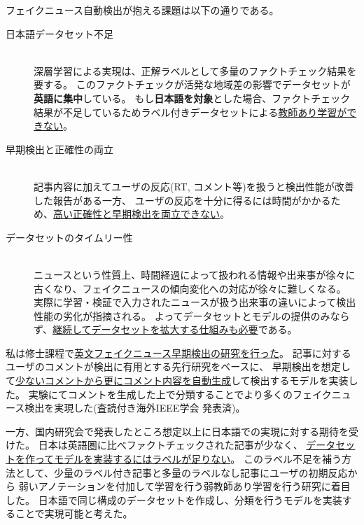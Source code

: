 フェイクニュース自動検出が抱える課題は以下の通りである。
\begin{description}
    \item[日本語データセット不足] \mbox{}\\
        深層学習による実現は、正解ラベルとして多量のファクトチェック結果を要する。
        このファクトチェックが活発な地域差の影響でデータセットが\textbf{英語に集中}\cite{fakenewsnet}している。
        もし\textbf{日本語を対象}とした場合、ファクトチェック結果が不足しているためラベル付きデータセットによる\underline{教師あり学習ができない}。
    \item[早期検出と正確性の両立] \mbox{}\\
        記事内容に加えてユーザの反応(RT, コメント等)を扱うと検出性能が改善した報告がある\cite{Wu:2018:TFF:3159652.3159677}一方、
        ユーザの反応を十分に得るには時間がかかるため、\underline{高い正確性と早期検出を両立できない}。
    \item[データセットのタイムリー性] \mbox{}\\
        ニュースという性質上、時間経過によって扱われる情報や出来事が徐々に古くなり、フェイクニュースの傾向変化への対応が徐々に難しくなる。
        実際に学習・検証で入力されたニュースが扱う出来事の違いによって検出性能の劣化が指摘される\cite{Wang:2018:EEA:3219819.3219903}。
        よってデータセットとモデルの提供のみならず、\underline{継続してデータセットを拡大する仕組みも必要}である。

\end{description}

私は修士課程で\underline{英文フェイクニュース早期検出の研究を行った}。
記事に対するユーザのコメントが検出に有用とする先行研究をベースに、
早期検出を想定して\underline{少ないコメントから更にコメント内容を自動生成}して検出するモデルを実装した。
実験にてコメントを生成した上で分類することでより多くのフェイクニュース検出を実現した(査読付き海外IEEE学会 発表済\cite{ines})。

一方、国内研究会で発表したところ想定以上に日本語での実現に対する期待を受けた。
日本は英語圏に比べファクトチェックされた記事が少なく、
\underline{データセットを作ってモデルを実装するにはラベルが足りない}。
このラベル不足を補う方法として、少量のラベル付き記事と多量のラベルなし記事にユーザの初期反応から
弱いアノテーションを付加して学習を行う弱教師あり学習を行う研究\cite{mwss}に着目した。
日本語で同じ構成のデータセットを作成し、分類を行うモデルを実装することで実現可能と考えた。

